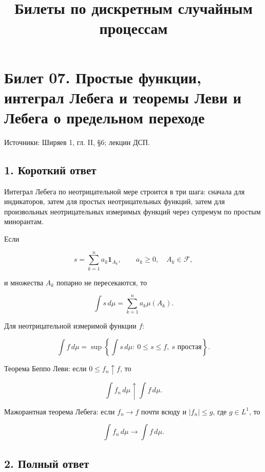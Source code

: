 \documentclass[
  11pt,
  a4paper,
]{article}
\title{Билеты по дискретным случайным процессам}
\author{}
\date{}
\begin{document}
\maketitle

\section{Билет 07. Простые функции, интеграл Лебега и теоремы Леви и
Лебега о предельном
переходе}\label{ux431ux438ux43bux435ux442-07.-ux43fux440ux43eux441ux442ux44bux435-ux444ux443ux43dux43aux446ux438ux438-ux438ux43dux442ux435ux433ux440ux430ux43b-ux43bux435ux431ux435ux433ux430-ux438-ux442ux435ux43eux440ux435ux43cux44b-ux43bux435ux432ux438-ux438-ux43bux435ux431ux435ux433ux430-ux43e-ux43fux440ux435ux434ux435ux43bux44cux43dux43eux43c-ux43fux435ux440ux435ux445ux43eux434ux435}

Источники: Ширяев 1, гл. II, §6; лекции ДСП.

\subsection{1. Короткий
ответ}\label{ux43aux43eux440ux43eux442ux43aux438ux439-ux43eux442ux432ux435ux442}

Интеграл Лебега по неотрицательной мере строится в три шага: сначала для
индикаторов, затем для простых неотрицательных функций, затем для
произвольных неотрицательных измеримых функций через супремум по простым
минорантам.

Если

\[
s=\sum_{k=1}^n a_k\mathbf 1_{A_k},
\qquad
a_k\ge0,\quad A_k\in\mathcal F,
\]

и множества \(A_k\) попарно не пересекаются, то

\[
\int s\,d\mu=\sum_{k=1}^n a_k\mu(A_k).
\]

Для неотрицательной измеримой функции \(f\):

\[
\int f\,d\mu
=
\sup\left\{\int s\,d\mu:\ 0\le s\le f,\ s\text{ простая}\right\}.
\]

Теорема Беппо Леви: если \(0\le f_n\uparrow f\), то

\[
\int f_n\,d\mu\uparrow\int f\,d\mu.
\]

Мажорантная теорема Лебега: если \(f_n\to f\) почти всюду и
\(|f_n|\le g\), где \(g\in L^1\), то

\[
\int f_n\,d\mu\to\int f\,d\mu.
\]

\subsection{2. Полный
ответ}\label{ux43fux43eux43bux43dux44bux439-ux43eux442ux432ux435ux442}
\end{document}
